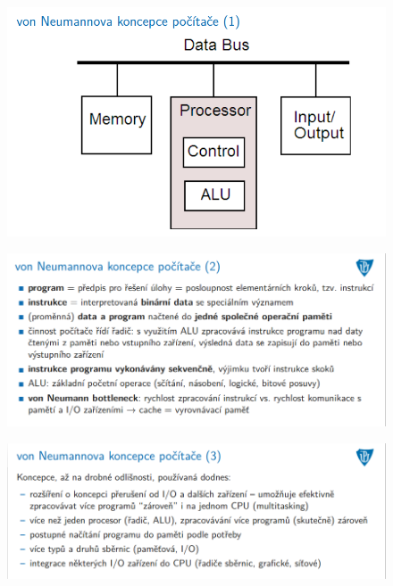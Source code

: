 \documentclass[10pt,a4paper]{article}
\begin{document}
\begin{figure} [h]
	\includegraphics[scale=0.65]{img/prvni_odstavec/otazka1/von_neuman2.png}	
\end{figure}

\begin{figure} [h]
	\includegraphics[scale=0.65]{img/prvni_odstavec/otazka1/von_neuman3.png}	
\end{figure}

\begin{figure} [h]
	\includegraphics[scale=0.65]{img/prvni_odstavec/otazka1/von_neuman4.png}	
\end{figure}

\clearpage
\end{document}
